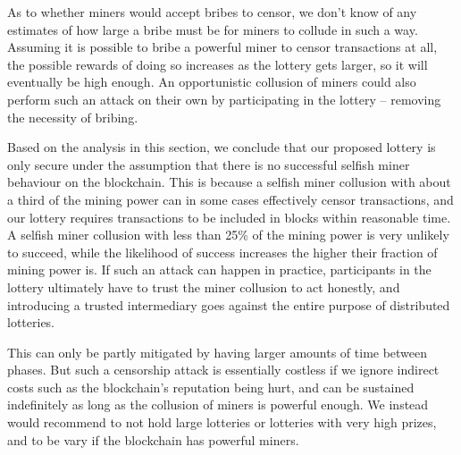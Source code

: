 As to whether miners would accept bribes to censor, we don't know of any estimates of how large a bribe must be for miners to collude in such a way. Assuming it is possible to bribe a powerful miner to censor transactions at all, the possible rewards of doing so increases as the lottery gets larger, so it will eventually be high enough. An opportunistic collusion of miners could also perform such an attack on their own by participating in the lottery – removing the necessity of bribing.

Based on the analysis in this section, we conclude that our proposed lottery is only secure under the assumption that there is no successful selfish miner behaviour on the blockchain. This is because a selfish miner collusion with about a third of the mining power can in some cases effectively censor transactions, and our lottery requires transactions to be included in blocks within reasonable time. A selfish miner collusion with less than 25\% of the mining power is very unlikely to succeed, while the likelihood of success increases the higher their fraction of mining power is. If such an attack can happen in practice, participants in the lottery ultimately have to trust the miner collusion to act honestly, and introducing a trusted intermediary goes against the entire purpose of distributed lotteries. 

This can only be partly mitigated by having larger amounts of time between phases. But such a censorship attack is essentially costless if we ignore indirect costs such as the blockchain's reputation being hurt, and can be sustained indefinitely as long as the collusion of miners is powerful enough. We instead would recommend to not hold large lotteries or lotteries with very high prizes, and to be vary if the blockchain has powerful miners.
